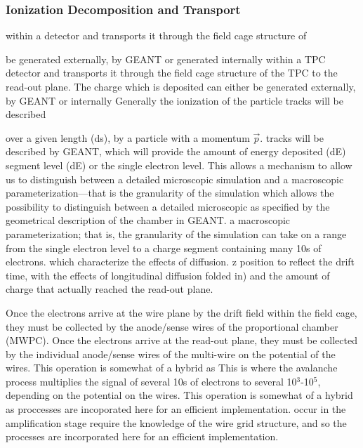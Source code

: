 \documentclass[twoside]{article}
\begin{document}
\subsubsection{Ionization Decomposition and Transport}
within a detector and transports it through the field cage structure of

be generated externally, by GEANT  or generated internally
within a TPC detector and transports it through the field cage structure of
the TPC to the read-out plane.  The charge which is deposited can either
be generated externally, by GEANT  or internally
Generally the ionization of the particle tracks will be described

over a given length (ds), by a particle with a momentum $\vec{p}$.
tracks will be described
by GEANT, which will provide the amount of energy deposited (dE) 
segment level (dE) or the single electron level.  This allows a mechanism 
to allow us to distinguish between a detailed microscopic simulation and
a macroscopic parameterization---that is the granularity of the simulation
which allows the possibility to distinguish between a detailed microscopic 
as specified by the geometrical description of the chamber in GEANT.
a macroscopic parameterization; that is, the granularity of the simulation
can take on a range from the single electron level to a charge segment
containing many 10s of electrons.
which characterize the effects of diffusion.
z position to reflect the drift time, with the effects of longitudinal
diffusion folded in) and the amount of charge that actually reached the
read-out plane.

Once the electrons arrive at the wire plane by the drift
field within the field cage, they must be collected by the anode/sense
wires of the proportional chamber (MWPC).
Once the electrons arrive at the read-out plane, they must be 
collected by the individual anode/sense wires of the multi-wire 
on the potential of the wires.  This operation is somewhat of a hybrid as
This is where the avalanche process multiplies
the signal of several 10s of electrons to several 10$^{3}$-10$^{5}$, depending
on the potential on the wires.  This operation is somewhat of a hybrid as
proccesses are incoporated here for an efficient implementation.
occur in the amplification
stage require the knowledge of the wire grid structure, and so the
processes are incorporated here for an efficient implementation.
\end{document}
